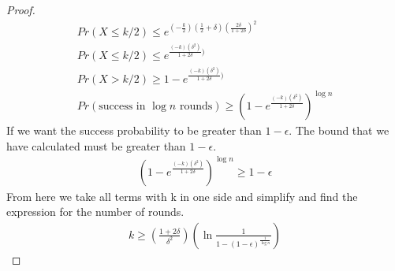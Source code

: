 \documentclass[solution,addpoints,12pt]{exam}
\begin{document}
\begin{questions}
\begin{parts}
\begin{solution}
\begin{proof}
  \begin{align*}
  Pr( X \leq k/2) \leq e^{(-\frac{k}{2})(\frac{1}{2}+\delta){(\frac{2\delta}{1+2 \delta})}^2}
  \\
  Pr( X \leq k/2) \leq e^{\frac{(-k)({\delta}^2)}{1+2 \delta})}  
  \\
  Pr(X > k/2) \geq 1 - e^{\frac{(-k)({\delta}^2)}{1+2 \delta})}
  \\
  Pr(\text{success in $\log n$ rounds}) \geq {(1 - e^{\frac{(-k)({\delta}^2)}{1+2 \delta}})}^{\log n}
  \end{align*}
  If we want the success probability to be greater than $1-\epsilon$. The bound that we have calculated must be greater than $1-\epsilon$.
  \begin{align*}
  {(1 - e^{\frac{(-k)({\delta}^2)}{1+2 \delta}})}^{\log n} \geq 1-\epsilon
  \end{align*}
  From here we take all terms with k in one side and simplify and find the expression for the number of rounds.
  \begin{align*}
  	k \geq (\frac{1+2 \delta}{\delta ^2})(\ln \frac{1}{1-{(1-\epsilon)}^{\frac{1}{\log n}}})
  \end{align*}
  \end{proof}
  \end{solution}

\end{parts}
\end{questions}
\end{document}
